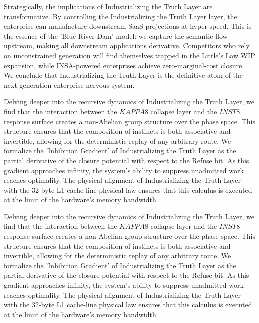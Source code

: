\documentclass[12pt,a4paper,oneside]{book}
\begin{document}
Strategically, the implications of Industrializing the Truth Layer are transformative. By controlling the Industrializing the Truth Layer layer, the enterprise can manufacture downstream SaaS projections at hyper-speed. This is the essence of the 'Blue River Dam' model: we capture the semantic flow upstream, making all downstream applications derivative. Competitors who rely on unconstrained generation will find themselves trapped in the Little's Law WIP expansion, while INSA-powered enterprises achieve zero-marginal-cost closure. We conclude that Industrializing the Truth Layer is the definitive atom of the next-generation enterprise nervous system. 

Delving deeper into the recursive dynamics of Industrializing the Truth Layer, we find that the interaction between the $KAPPA8$ collapse layer and the $INST8$ response surface creates a non-Abelian group structure over the phase space. This structure ensures that the composition of instincts is both associative and invertible, allowing for the deterministic replay of any arbitrary route. We formalize the 'Inhibition Gradient' of Industrializing the Truth Layer as the partial derivative of the closure potential with respect to the Refuse bit. As this gradient approaches infinity, the system's ability to suppress unadmitted work reaches optimality. The physical alignment of Industrializing the Truth Layer with the 32-byte L1 cache-line physical law ensures that this calculus is executed at the limit of the hardware's memory bandwidth. 

Delving deeper into the recursive dynamics of Industrializing the Truth Layer, we find that the interaction between the $KAPPA8$ collapse layer and the $INST8$ response surface creates a non-Abelian group structure over the phase space. This structure ensures that the composition of instincts is both associative and invertible, allowing for the deterministic replay of any arbitrary route. We formalize the 'Inhibition Gradient' of Industrializing the Truth Layer as the partial derivative of the closure potential with respect to the Refuse bit. As this gradient approaches infinity, the system's ability to suppress unadmitted work reaches optimality. The physical alignment of Industrializing the Truth Layer with the 32-byte L1 cache-line physical law ensures that this calculus is executed at the limit of the hardware's memory bandwidth. 
\end{document}
